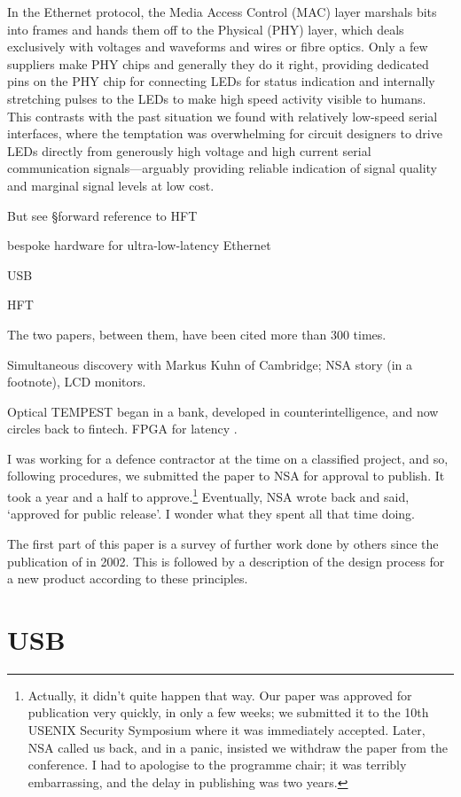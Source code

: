 \documentclass[conference]{IEEEtran}
\begin{document}
In the Ethernet protocol, the Media Access Control (MAC) layer marshals bits
into frames and hands them off to the Physical (PHY) layer, which deals
exclusively with voltages and waveforms and wires or fibre optics. Only a few
suppliers make PHY chips and generally they do it right, providing dedicated
pins on the PHY chip for connecting LEDs for status indication and internally
stretching pulses to the LEDs to make high speed activity visible to humans.
This contrasts with the past situation we found with relatively low-speed
serial interfaces, where the temptation was overwhelming for circuit
designers to drive LEDs directly from generously high voltage and high
current serial communication signals---arguably providing reliable indication
of signal quality and marginal signal levels at low cost.

But see \S forward reference to HFT

bespoke hardware for ultra-low-latency Ethernet

USB

HFT

The two papers, between them, have been cited more than 300 times.

Simultaneous discovery with Markus Kuhn of Cambridge; NSA story (in a
footnote), LCD monitors.

Optical TEMPEST began in a bank, developed in counterintelligence,
and now circles back to fintech. FPGA for latency \cite{Hurd2018a}.

I was working for a defence contractor at the time on a classified project,
and so, following procedures, we submitted the paper to NSA for approval to
publish. It took a year and a half to approve.\footnote{Actually, it didn't
quite happen that way. Our paper was approved for publication very quickly,
in only a few weeks; we submitted it to the 10th USENIX Security Symposium
where it was immediately accepted. Later, NSA called us back, and in a panic,
insisted we withdraw the paper from the conference. I had to apologise to the
programme chair; it was terribly embarrassing, and the delay in publishing was
two years.} Eventually, NSA wrote back and said, `approved for public
release'. I wonder what they spent all that time doing.

The first part of this paper is a survey of further work done by others since
the publication of \cite{Loughry2002a} in 2002. This is followed by a
description of the design process for a new product according to these
principles.

\section{USB}
\end{document}
